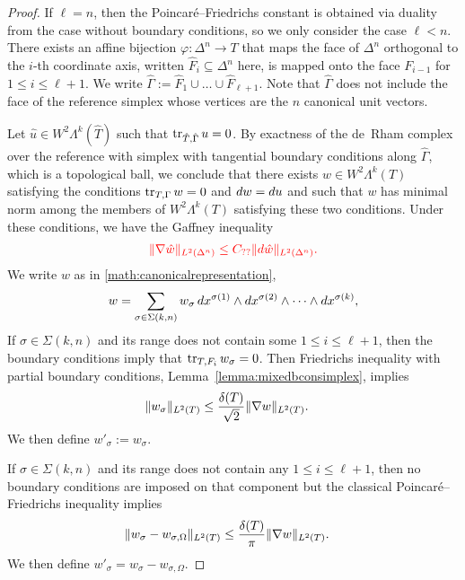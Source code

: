 \documentclass[10pt,a4paper]{article}
\begin{document}
\begin{proof}
    If $\ell = n$, then the Poincar\'e--Friedrichs constant is obtained via duality from the case without boundary conditions, 
    so we only consider the case $\ell < n$.
    There exists an affine bijection $\varphi : \Delta^n \rightarrow T$ 
    that maps 
    the face of $\Delta^n$
    orthogonal to the $i$-th coordinate axis, written $\hat F_{i} \subseteq \Delta^n$ here, is mapped onto the face $F_{i-1}$ for $1 \leq i \leq \ell+1$.
    We write $\hat \Gamma := \hat F_{1} \cup \dots \cup \hat F_{\ell+1}$.
    Note that $\hat\Gamma$ does not include the face of the reference simplex whose vertices are the $n$ canonical unit vectors. 
    
    Let $\hat u \in W^{2}\Lambda^{k}(\hat T)$ such that $\operatorname{tr}_{\hat T,\hat\Gamma} u = 0$.
    By exactness of the de~Rham complex over the reference with simplex 
    with tangential boundary conditions along $\hat\Gamma$, which is a topological ball, 
    we conclude that there exists $w \in W^{2}\Lambda^{k}(T)$ satisfying the conditions $\operatorname{tr}_{T,\Gamma} w = 0$
    and $d w = d u$ and such that $w$ has minimal norm among the members of $W^{2}\Lambda^{k}(T)$ satisfying these two conditions.
    Under these conditions, we have the Gaffney inequality 
    \begin{align}\color{red}
        \| \nabla \hat w \|_{L^{2}(\Delta^{n})}
        \leq 
        C_{??}
        \| d \hat w \|_{L^{2}(\Delta^{n})}
        .
    \end{align}
    We write $w$ as in \eqref{math:canonicalrepresentation},
    \begin{gather}
        w
        = 
        \sum_{ \sigma \in \Sigma(k,n) } 
        w_{\sigma} \, 
        dx^{\sigma(1)} \wedge dx^{\sigma(2)} \wedge \cdots \wedge dx^{\sigma(k)},
    \end{gather}
    If $\sigma \in \Sigma(k,n)$ and its range does not contain some $1 \leq i \leq \ell+1$,
    then the boundary conditions imply that $\operatorname{tr}_{T,F_{i}} w_{\sigma} = 0$.
    Then Friedrichs inequality with partial boundary conditions, Lemma~\ref{lemma:mixedbconsimplex},
    implies 
    \begin{align*}
        \| w_{\sigma} \|_{L^{2}(T)}
        &
        \leq 
        \frac{{\delta}(T)}{\sqrt{2}}
        \| \nabla w \|_{L^{2}(T)}
        .
    \end{align*}
    We then define $w'_{\sigma} := w_{\sigma}$.
    
    If $\sigma \in \Sigma(k,n)$ and its range does not contain any $1 \leq i \leq \ell+1$,
    then no boundary conditions are imposed on that component but the classical Poincar\'e--Friedrichs inequality implies 
    \begin{align*}
        \| w_{\sigma} - w_{\sigma,\Omega} \|_{L^{2}(T)}
        &
        \leq 
        \frac{{\delta}(T)}{\pi}
        \| \nabla w \|_{L^{2}(T)}
        .
    \end{align*}
    We then define $w'_{\sigma} = w_{\sigma} - w_{\sigma,\Omega}$. 
    

\end{proof}
\end{document}
